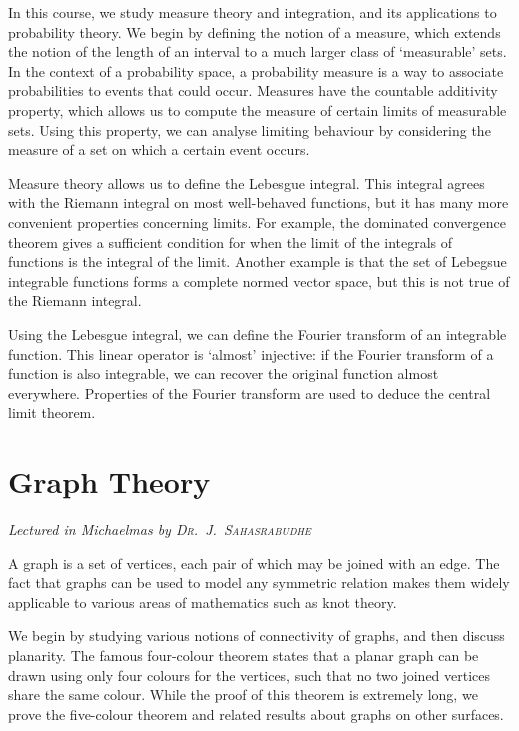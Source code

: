 In this course, we study measure theory and integration, and its applications to probability theory.
We begin by defining the notion of a measure, which extends the notion of the length of an interval to a much larger class of `measurable' sets.
In the context of a probability space, a probability measure is a way to associate probabilities to events that could occur.
Measures have the countable additivity property, which allows us to compute the measure of certain limits of measurable sets.
Using this property, we can analyse limiting behaviour by considering the measure of a set on which a certain event occurs.

Measure theory allows us to define the Lebesgue integral.
This integral agrees with the Riemann integral on most well-behaved functions, but it has many more convenient properties concerning limits.
For example, the dominated convergence theorem gives a sufficient condition for when the limit of the integrals of functions is the integral of the limit.
Another example is that the set of Lebegsue integrable functions forms a complete normed vector space, but this is not true of the Riemann integral.

Using the Lebesgue integral, we can define the Fourier transform of an integrable function.
This linear operator is `almost' injective: if the Fourier transform of a function is also integrable, we can recover the original function almost everywhere.
Properties of the Fourier transform are used to deduce the central limit theorem.



\chapter[Graph Theory \\ \textnormal{\emph{Lectured in Michaelmas \oldstylenums{2022} by \textsc{Dr.\ J.\ Sahasrabudhe}}}]{Graph Theory}
\emph{\Large Lectured in Michaelmas  by \textsc{Dr.\ J.\ Sahasrabudhe}}

A graph is a set of vertices, each pair of which may be joined with an edge.
The fact that graphs can be used to model any symmetric relation makes them widely applicable to various areas of mathematics such as knot theory.

We begin by studying various notions of connectivity of graphs, and then discuss planarity.
The famous four-colour theorem states that a planar graph can be drawn using only four colours for the vertices, such that no two joined vertices share the same colour.
While the proof of this theorem is extremely long, we prove the five-colour theorem and related results about graphs on other surfaces.

